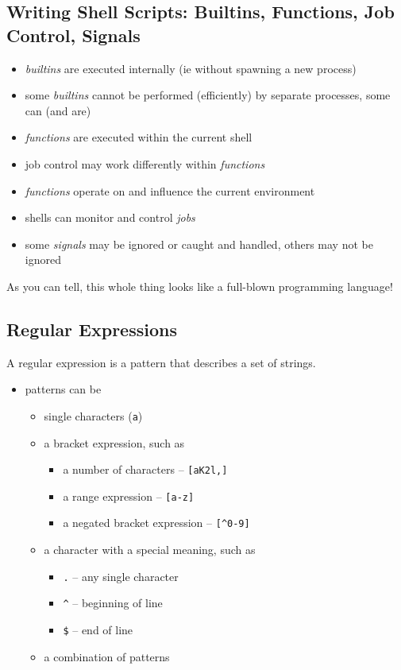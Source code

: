 \documentclass[xga]{xdvislides}
\begin{document}
\subsection{Writing Shell Scripts: Builtins, Functions, Job Control, Signals}
\begin{itemize}
	\item {\em builtins} are executed internally (ie without spawning a
		new process)
	\item some {\em builtins} cannot be performed (efficiently) by
		separate processes, some can (and are)
	\item {\em functions} are executed within the current shell
	\item job control may work differently within {\em functions}
	\item {\em functions} operate on and influence the current environment
	\item shells can monitor and control {\em jobs}
	\item some {\em signals} may be ignored or caught and handled, others
		may not be ignored
\end{itemize}
\addvspace{.5in}
As you can tell, this whole thing looks like a full-blown programming language!



\subsection{Regular Expressions}
A regular expression is a pattern that describes a set of strings. \\

\begin{itemize}
	\item patterns can be
		\begin{itemize}
			\item single characters (\verb+a+)
			\item a bracket expression, such as
				\begin{itemize}
					\item a number of characters -- \verb+[aK2l,]+
					\item a range expression -- \verb+[a-z]+
					\item a negated bracket expression -- \verb+[^0-9]+
				\end{itemize}
			\item a character with a special meaning, such as
				\begin{itemize}
					\item \verb+.+ -- any single character
					\item \verb+^+ -- beginning of line
					\item \verb+$+ -- end of line
				\end{itemize}
			\item a combination of patterns
		\end{itemize}
\end{itemize}
\end{document}
